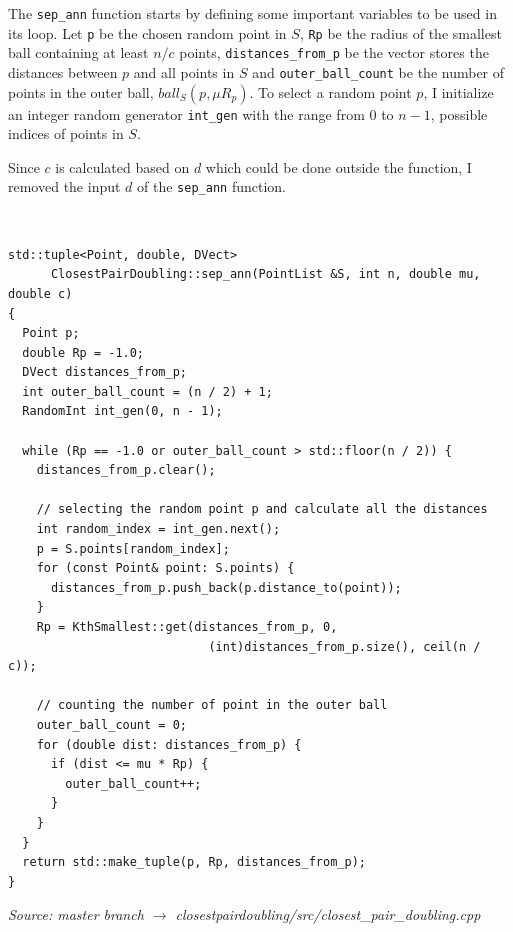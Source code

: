\documentclass[12pt,english,]{article}
\newcommand{\code}[1]{\colorbox{light-gray}{\texttt{#1}}}
\begin{document}
The \code{sep\_ann} function starts by defining some important variables
to be used in its loop. Let \code{p} be the chosen random point in
\(S\), \code{Rp} be the radius of the smallest ball containing at least
\(n/c\) points, \code{distances\_from\_p} be the vector stores the
distances between \(p\) and all points in \(S\) and
\code{outer\_ball\_count} be the number of points in the outer ball,
\(ball_S(p,\mu R_p)\). To select a random point \(p\), I initialize an
integer random generator \code{int\_gen} with the range from 0 to
\(n - 1\), possible indices of points in \(S\).

Since \(c\) is calculated based on \(d\) which could be done outside the
function, I removed the input \(d\) of the \code{sep\_ann} function.

~

\begin{lstlisting}
std::tuple<Point, double, DVect>
      ClosestPairDoubling::sep_ann(PointList &S, int n, double mu, double c)
{
  Point p;
  double Rp = -1.0;
  DVect distances_from_p;
  int outer_ball_count = (n / 2) + 1;
  RandomInt int_gen(0, n - 1);

  while (Rp == -1.0 or outer_ball_count > std::floor(n / 2)) {
    distances_from_p.clear();

    // selecting the random point p and calculate all the distances
    int random_index = int_gen.next();
    p = S.points[random_index];
    for (const Point& point: S.points) {
      distances_from_p.push_back(p.distance_to(point));
    }
    Rp = KthSmallest::get(distances_from_p, 0,
                            (int)distances_from_p.size(), ceil(n / c));

    // counting the number of point in the outer ball
    outer_ball_count = 0;
    for (double dist: distances_from_p) {
      if (dist <= mu * Rp) {
        outer_ball_count++;
      }
    }
  }
  return std::make_tuple(p, Rp, distances_from_p);
}
\end{lstlisting}
\vspace{-9truemm}
\begin{minipage}{1\textwidth}
  \begin{flushright}
  {\footnotesize \emph{Source: master branch $\rightarrow$ closestpairdoubling/src/closest\_pair\_doubling.cpp}\par}
  \end{flushright}
\end{minipage}
\vspace{0.5truemm}
\end{document}
